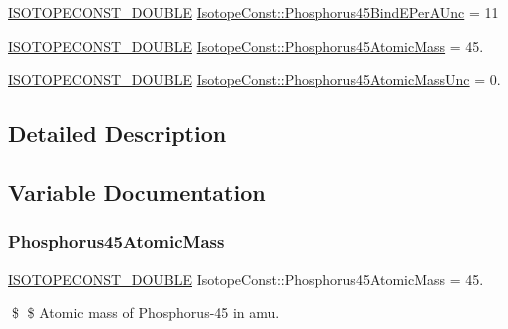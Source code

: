 \begin{DoxyCompactItemize}
\mbox{\hyperlink{group___isotope_const-_macros_ga8f45a7272ce02c0b4c65c44636ed719a}{I\+S\+O\+T\+O\+P\+E\+C\+O\+N\+S\+T\+\_\+\+D\+O\+U\+B\+LE}} \mbox{\hyperlink{group___isotope_const-_phosphorus-_p45_gaabaaa266d3c7e95448394bdcbc1f1583}{Isotope\+Const\+::\+Phosphorus45\+Bind\+E\+Per\+A\+Unc}} = 11
\item 
\mbox{\hyperlink{group___isotope_const-_macros_ga8f45a7272ce02c0b4c65c44636ed719a}{I\+S\+O\+T\+O\+P\+E\+C\+O\+N\+S\+T\+\_\+\+D\+O\+U\+B\+LE}} \mbox{\hyperlink{group___isotope_const-_phosphorus-_p45_ga33da8be2a26c45327810ab9454846249}{Isotope\+Const\+::\+Phosphorus45\+Atomic\+Mass}} = 45.
\item 
\mbox{\hyperlink{group___isotope_const-_macros_ga8f45a7272ce02c0b4c65c44636ed719a}{I\+S\+O\+T\+O\+P\+E\+C\+O\+N\+S\+T\+\_\+\+D\+O\+U\+B\+LE}} \mbox{\hyperlink{group___isotope_const-_phosphorus-_p45_gaad1a2353111055381ef3e4ac9b2525e8}{Isotope\+Const\+::\+Phosphorus45\+Atomic\+Mass\+Unc}} = 0.
\end{DoxyCompactItemize}


\subsection{Detailed Description}


\subsection{Variable Documentation}
\mbox{\label{group___isotope_const-_phosphorus-_p45_ga33da8be2a26c45327810ab9454846249}} 
\subsubsection{\texorpdfstring{Phosphorus45\+Atomic\+Mass}{Phosphorus45AtomicMass}}
{\footnotesize\ttfamily \mbox{\hyperlink{group___isotope_const-_macros_ga8f45a7272ce02c0b4c65c44636ed719a}{I\+S\+O\+T\+O\+P\+E\+C\+O\+N\+S\+T\+\_\+\+D\+O\+U\+B\+LE}} Isotope\+Const\+::\+Phosphorus45\+Atomic\+Mass = 45.}

\$ \$ Atomic mass of Phosphorus-\/45 in amu. \mbox{\label{group___isotope_const-_phosphorus-_p45_gaad1a2353111055381ef3e4ac9b2525e8}} 
